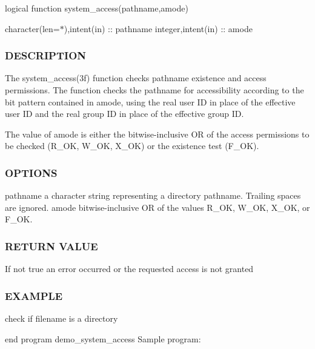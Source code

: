 logical function system\+\_\+access(pathname,amode)

character(len=$\ast$),intent(in) \+:\+: pathname integer,intent(in) \+:\+: amode

\subsubsection*{D\+E\+S\+C\+R\+I\+P\+T\+I\+ON}

\begin{DoxyVerb}The system_access(3f) function checks pathname existence and access
permissions.  The function checks the pathname for accessibility
according to the bit pattern contained in amode, using the real user
ID in place of the effective user ID and the real group ID in place
of the effective group ID.

The value of amode is either the bitwise-inclusive OR of the access
permissions to be checked (R_OK, W_OK, X_OK) or the existence test (F_OK).
\end{DoxyVerb}


\subsubsection*{O\+P\+T\+I\+O\+NS}

pathname a character string representing a directory pathname. Trailing spaces are ignored. amode bitwise-\/inclusive OR of the values R\+\_\+\+OK, W\+\_\+\+OK, X\+\_\+\+OK, or F\+\_\+\+OK.

\subsubsection*{R\+E\+T\+U\+RN V\+A\+L\+UE}

If not true an error occurred or the requested access is not granted

\subsubsection*{E\+X\+A\+M\+P\+LE}

check if filename is a directory

end program demo\+\_\+system\+\_\+access Sample program\+:


